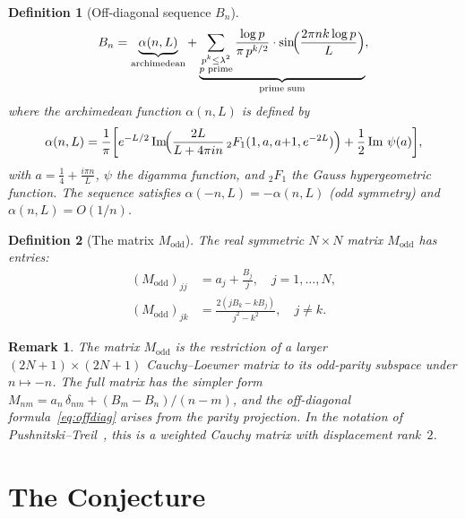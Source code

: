 \documentclass[11pt,a4paper]{article}
\newtheorem{definition}{Definition}
\newtheorem{remark}{Remark}
\begin{document}
\begin{definition}[Off-diagonal sequence $B_n$]\label{def:Bn}
\begin{equation}\label{eq:Bn}
B_n = \underbrace{\alpha(n, L)}_{\text{archimedean}} + \underbrace{\sum_{\substack{p^k \leq \lambda^2 \\ p \text{ prime}}} \frac{\log p}{\pi\, p^{k/2}} \cdot \sin\!\Bigl(\frac{2\pi n k \log p}{L}\Bigr)}_{\text{prime sum}},
\end{equation}
where the archimedean function $\alpha(n, L)$ is defined by
\begin{equation}\label{eq:alpha}
\alpha(n, L) = \frac{1}{\pi}\biggl[e^{-L/2}\operatorname{Im}\!\Bigl(\frac{2L}{L + 4\pi i n}\,{}_2F_1(1, a, a{+}1, e^{-2L})\Bigr) + \frac{1}{2}\operatorname{Im}\,\psi(a)\biggr],
\end{equation}
with $a = \tfrac{1}{4} + \tfrac{i\pi n}{L}$, $\psi$ the digamma function, and ${}_2F_1$ the Gauss hypergeometric function. The sequence satisfies $\alpha(-n, L) = -\alpha(n, L)$ (odd symmetry) and $\alpha(n, L) = O(1/n)$.
\end{definition}

\begin{definition}[The matrix $M_{\mathrm{odd}}$]\label{def:Modd}
The real symmetric $N \times N$ matrix $M_{\mathrm{odd}}$ has entries:
\begin{align}
(M_{\mathrm{odd}})_{jj} &= a_j + \frac{B_j}{j}, \quad j = 1, \ldots, N, \label{eq:diag}\\
(M_{\mathrm{odd}})_{jk} &= \frac{2(j B_k - k B_j)}{j^2 - k^2}, \quad j \neq k. \label{eq:offdiag}
\end{align}
\end{definition}

\begin{remark}
The matrix $M_{\mathrm{odd}}$ is the restriction of a larger $(2N+1) \times (2N+1)$ Cauchy--Loewner matrix to its odd-parity subspace under $n \mapsto -n$. The full matrix has the simpler form $M_{nm} = a_n\, \delta_{nm} + (B_m - B_n)/(n - m)$, and the off-diagonal formula~\eqref{eq:offdiag} arises from the parity projection. In the notation of Pushnitski--Treil~\cite{PT2025}, this is a weighted Cauchy matrix with displacement rank~$2$.
\end{remark}

\section{The Conjecture}
\end{document}
